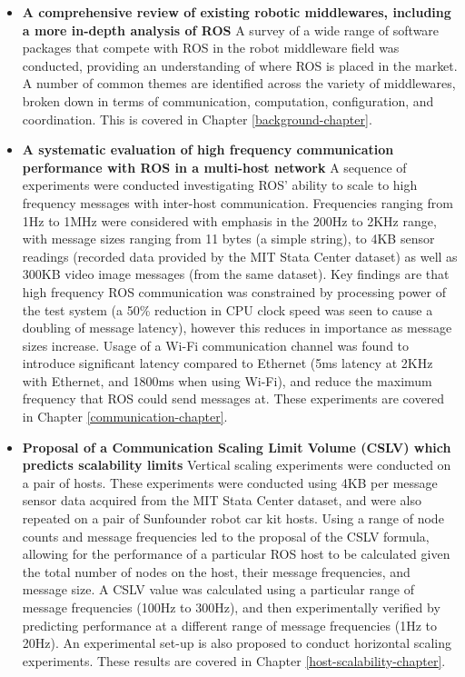 \documentclass[../dissertation.tex]{subfiles}
\begin{document}
\begin{itemize}

  \item \textbf{A comprehensive review of existing robotic middlewares, including a more in-depth analysis of ROS} A survey of a wide range of software packages that compete with ROS in the robot middleware field was conducted, providing an understanding of where ROS is placed in the market. A number of common themes are identified across the variety of middlewares, broken down in terms of communication, computation, configuration, and coordination. This is covered in Chapter \ref{background-chapter}.

  \item \textbf{A systematic evaluation of high frequency communication performance with ROS in a multi-host network} A sequence of experiments were conducted investigating ROS' ability to scale to high frequency messages with inter-host communication. Frequencies ranging from 1Hz to 1MHz were considered with emphasis in the 200Hz to 2KHz range, with message sizes ranging from 11 bytes (a simple string), to 4KB sensor readings (recorded data provided by the MIT Stata Center dataset\cite{mit-stata-center-dataset}) as well as 300KB video image messages (from the same dataset). Key findings are that high frequency ROS communication was constrained by processing power of the test system (a 50\% reduction in CPU clock speed was seen to cause a doubling of message latency), however this reduces in importance as message sizes increase. Usage of a Wi-Fi communication channel was found to introduce significant latency compared to Ethernet (5ms latency at 2KHz with Ethernet, and 1800ms when using Wi-Fi), and reduce the maximum frequency that ROS could send messages at. These experiments are covered in Chapter \ref{communication-chapter}.

  \item \textbf{Proposal of a Communication Scaling Limit Volume (CSLV) which predicts scalability limits} Vertical scaling experiments were conducted on a pair of hosts. These experiments were conducted using 4KB per message sensor data acquired from the MIT Stata Center dataset\cite{mit-stata-center-dataset}, and were also repeated on a pair of Sunfounder robot car kit hosts. Using a range of node counts and message frequencies led to the proposal of the CSLV formula, allowing for the performance of a particular ROS host to be calculated given the total number of nodes on the host, their message frequencies, and message size. A CSLV value was calculated using a particular range of message frequencies (100Hz to 300Hz), and then experimentally verified by predicting performance at a different range of message frequencies (1Hz to 20Hz). An experimental set-up is also proposed to conduct horizontal scaling experiments. These results are covered in Chapter \ref{host-scalability-chapter}.

\end{itemize}
\end{document}
